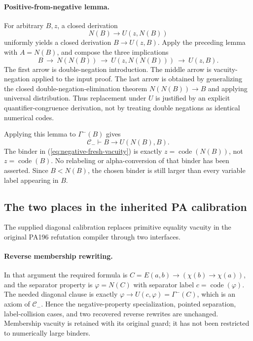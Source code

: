 \paragraph{Positive-from-negative lemma.}
For arbitrary $B,z$, a closed derivation
\[
                     N(B)\to U(z,N(B))
\]
uniformly yields a closed derivation $B\to U(z,B)$. Apply the preceding
lemma with $A=N(B)$, and compose the three implications
\[
 B\ \longrightarrow\ N(N(B))\
   \longrightarrow\ U(z,N(N(B)))\
   \longrightarrow\ U(z,B).
\]
The first arrow is double-negation introduction. The middle arrow is
vacuity-negation applied to the input proof. The last arrow is obtained
by generalizing the closed double-negation-elimination theorem
$N(N(B))\to B$ and applying universal distribution. Thus replacement
under $U$ is justified by an explicit quantifier-congruence derivation,
not by treating double negations as identical numerical codes.

Applying this lemma to $\Gamma^-(B)$ gives
\begin{equation}
 \mathcal C_-\vdash B\to U(N(B),B).
 \label{eq:negative-fresh-vacuity}
\end{equation}
The binder in (\ref{eq:negative-fresh-vacuity}) is exactly
$z=\operatorname{code}(N(B))$, not $z=\operatorname{code}(B)$.
No relabeling or alpha-conversion of that binder has been asserted.
Since $B<N(B)$, the chosen binder is still larger than every variable
label appearing in $B$.

\subsection{The two places in the inherited PA calibration}

The supplied diagonal calibration replaces primitive equality vacuity in
the original PA196 refutation compiler through two interfaces.

\paragraph{Reverse membership rewriting.}
In that argument the required formula is
$C=E(a,b)\to(\chi(b)\to\chi(a))$, and the separator property is
$\varphi=N(C)$ with separator label $c=\operatorname{code}(\varphi)$.
The needed diagonal clause is exactly
$\varphi\to U(c,\varphi)=\Gamma^-(C)$, which is an axiom of
$\mathcal C_-$. Hence the negative-property specialization, pointed
separation, label-collision cases, and two recovered reverse rewrites
are unchanged. Membership vacuity is retained with its original guard;
it has not been restricted to numerically large binders.

